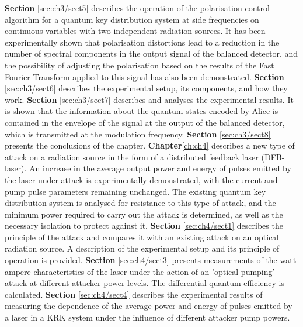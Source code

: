 \newline \textbf{Section} \ref{sec:ch3/sect5} describes the operation of the polarisation control algorithm for a quantum key distribution system at side frequencies on continuous variables with two independent radiation sources. It has been experimentally shown that polarisation distortions lead to a reduction in the number of spectral components in the output signal of the balanced detector, and the possibility of adjusting the polarisation based on the results of the Fast Fourier Transform applied to this signal has also been demonstrated.
\newline \textbf{Section} \ref{sec:ch3/sect6} describes the experimental setup, its components, and how they work.
\newline \textbf{Section} \ref{sec:ch3/sect7} describes and analyses the experimental results. It is shown that the information about the quantum states encoded by Alice is contained in the envelope of the signal at the output of the balanced detector, which is transmitted at the modulation frequency.
\newline \textbf{Section} \ref{sec:ch3/sect8} presents the conclusions of the chapter.
\newline \textbf{Chapter}\ref{ch:ch4} describes a new type of attack on a radiation source in the form of a distributed feedback laser (DFB-laser). An increase in the average output power and energy of pulses emitted by the laser under attack is experimentally demonstrated, with the current and pump pulse parameters remaining unchanged. The existing quantum key distribution system is analysed for resistance to this type of attack, and the minimum power required to carry out the attack is determined, as well as the necessary isolation to protect against it.
\newline \textbf{Section} \ref{sec:ch4/sect1} describes the principle of the attack and compares it with an existing attack on an optical radiation source. A description of the experimental setup and its principle of operation is provided.
\newline \textbf{Section} \ref{sec:ch4/sect3} presents measurements of the watt-ampere characteristics of the laser under the action of an 'optical pumping' attack at different attacker power levels. The differential quantum efficiency is calculated.
\newline \textbf{Section} \ref{sec:ch4/sect4} describes the experimental results of measuring the dependence of the average power and energy of pulses emitted by a laser in a KRK system under the influence of different attacker pump powers.
